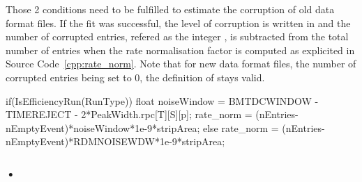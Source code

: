 	Those 2 conditions need to be fulfilled to estimate the corruption of old data format files. If the fit was successful, the  level of corruption is written in  and the number of corrupted entries, refered as the integer , is subtracted from the total number of entries when the rate normalisation factor is computed as explicited in Source Code~\ref{cpp:rate_norm}. Note that for new data format files, the number of corrupted entries being set to 0, the definition of  stays valid.\\
	
	\begin{code}
	\begin{cppcode}
if(IsEfficiencyRun(RunType)){
	float noiseWindow = BMTDCWINDOW - TIMEREJECT - 2*PeakWidth.rpc[T][S][p];
	rate_norm = (nEntries-nEmptyEvent)*noiseWindow*1e-9*stripArea;
} else
	rate_norm = (nEntries-nEmptyEvent)*RDMNOISEWDW*1e-9*stripArea;
	\end{cppcode}
	\label{cpp:rate_norm}
	\vspace{5mm}
	\end{code}
	
		\subsubsection{•}

\clearpage{\pagestyle{empty}\cleardoublepage}